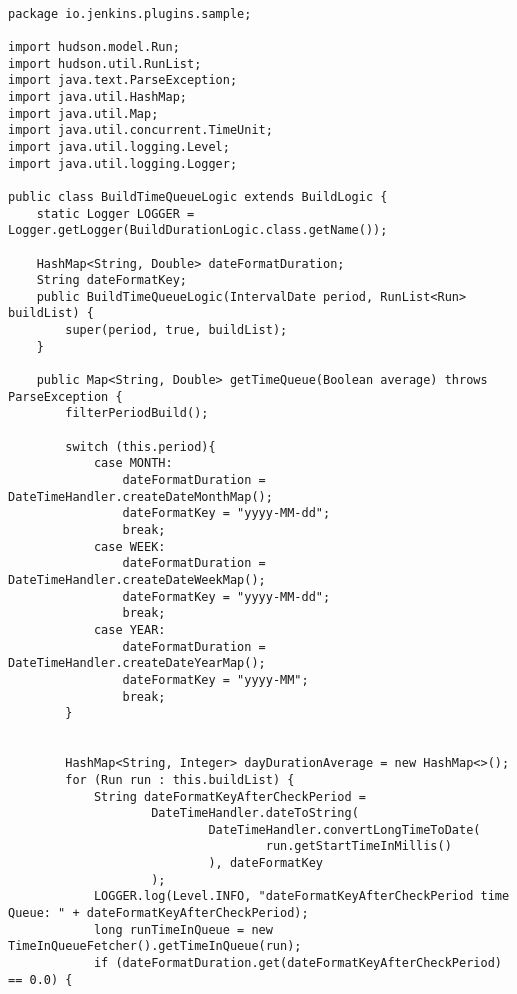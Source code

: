 \begin{lstlisting}

package io.jenkins.plugins.sample;

import hudson.model.Run;
import hudson.util.RunList;
import java.text.ParseException;
import java.util.HashMap;
import java.util.Map;
import java.util.concurrent.TimeUnit;
import java.util.logging.Level;
import java.util.logging.Logger;

public class BuildTimeQueueLogic extends BuildLogic {
    static Logger LOGGER = Logger.getLogger(BuildDurationLogic.class.getName());

    HashMap<String, Double> dateFormatDuration;
    String dateFormatKey;
    public BuildTimeQueueLogic(IntervalDate period, RunList<Run> buildList) {
        super(period, true, buildList);
    }

    public Map<String, Double> getTimeQueue(Boolean average) throws ParseException {
        filterPeriodBuild();

        switch (this.period){
            case MONTH:
                dateFormatDuration = DateTimeHandler.createDateMonthMap();
                dateFormatKey = "yyyy-MM-dd";
                break;
            case WEEK:
                dateFormatDuration = DateTimeHandler.createDateWeekMap();
                dateFormatKey = "yyyy-MM-dd";
                break;
            case YEAR:
                dateFormatDuration = DateTimeHandler.createDateYearMap();
                dateFormatKey = "yyyy-MM";
                break;
        }


        HashMap<String, Integer> dayDurationAverage = new HashMap<>();
        for (Run run : this.buildList) {
            String dateFormatKeyAfterCheckPeriod =
                    DateTimeHandler.dateToString(
                            DateTimeHandler.convertLongTimeToDate(
                                    run.getStartTimeInMillis()
                            ), dateFormatKey
                    );
            LOGGER.log(Level.INFO, "dateFormatKeyAfterCheckPeriod time Queue: " + dateFormatKeyAfterCheckPeriod);
            long runTimeInQueue = new TimeInQueueFetcher().getTimeInQueue(run);
            if (dateFormatDuration.get(dateFormatKeyAfterCheckPeriod) == 0.0) {


\end{lstlisting}
